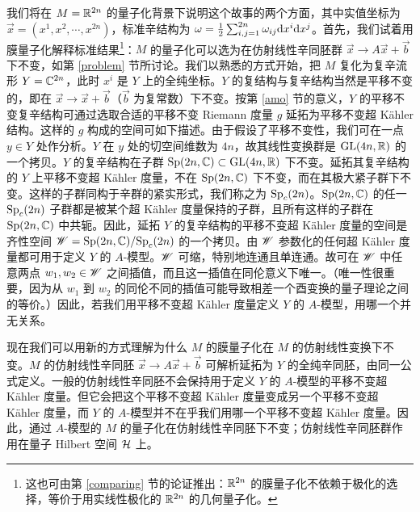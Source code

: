我们将在 $M={\mathbb R}^{2n}$ 的量子化背景下说明这个故事的两个方面，其中实值坐标为 $\vec x=(x^1,x^2,\cdots,x^{2n})$，标准辛结构为 $\omega=\frac12\sum_{i,j=1}^{2n}\omega_{ij}{\mathrm d} x^i{\mathrm d} x^j$。首先，我们试着用膜量子化解释标准结果\footnote{这也可由第 \ref{comparing} 节的论证推出：${\mathbb R}^{2n}$ 的膜量子化不依赖于极化的选择，等价于用实线性极化的 ${\mathbb R}^{2n}$ 的几何量子化。}：$M$ 的量子化可以选为在仿射线性辛同胚群 $\vec x\to A\vec x+\vec b$ 下不变，如第 \ref{problem} 节所讨论。我们以熟悉的方式开始，把 $M$ 复化为复辛流形 $Y={\mathbb C}^{2n}$，此时 $x^i$ 是 $Y$ 上的全纯坐标。$Y$ 的复结构与复辛结构当然是平移不变的，即在 $\vec x\to\vec x+\vec b$（$\vec b$ 为复常数）下不变。按第 \ref{amo} 节的意义，$Y$ 的平移不变复辛结构可通过选取合适的平移不变 Riemann 度量 $g$ 延拓为平移不变超 Kähler 结构。这样的 $g$ 构成的空间可如下描述。由于假设了平移不变性，我们可在一点 $y\in Y$ 处作分析。$Y$ 在 $y$ 处的切空间维数为 $4n$，故其线性变换群是 ${\mathrm{GL}}(4n,{\mathbb R})$ 的一个拷贝。$Y$ 的复辛结构在子群 ${\mathrm{Sp}}(2n,{\mathbb C})\subset{\mathrm{GL}}(4n,{\mathbb R})$ 下不变。延拓其复辛结构的 $Y$ 上平移不变超 Kähler 度量，不在 ${\mathrm{Sp}}(2n,{\mathbb C})$ 下不变，而在其极大紧子群下不变。这样的子群同构于辛群的紧实形式，我们称之为 ${\mathrm{Sp}}_c(2n)$。${\mathrm{Sp}}(2n,{\mathbb C})$ 的任一 ${\mathrm{Sp}}_c(2n)$ 子群都是被某个超 Kähler 度量保持的子群，且所有这样的子群在 ${\mathrm{Sp}}(2n,{\mathbb C})$ 中共轭。因此，延拓 $Y$ 的复辛结构的平移不变超 Kähler 度量的空间是齐性空间 ${\mathscr W}={\mathrm{Sp}}(2n,{\mathbb C})/{\mathrm{Sp}}_c(2n)$ 的一个拷贝。由 ${\mathscr W}$ 参数化的任何超 Kähler 度量都可用于定义 $Y$ 的 $A$-模型。${\mathscr W}$ 可缩，特别地连通且单连通。故可在 ${\mathscr W}$ 中任意两点 $w_1,w_2\in{\mathscr W}$ 之间插值，而且这一插值在同伦意义下唯一。（唯一性很重要，因为从 $w_1$ 到 $w_2$ 的同伦不同的插值可能导致相差一个酉变换的量子理论之间的等价。）因此，若我们用平移不变超 Kähler 度量定义 $Y$ 的 $A$-模型，用哪一个并无关系。

现在我们可以用新的方式理解为什么 $M$ 的膜量子化在 $M$ 的仿射线性变换下不变。$M$ 的仿射线性辛同胚 $\vec x\to A\vec x+\vec b$ 可解析延拓为 $Y$ 的全纯辛同胚，由同一公式定义。一般的仿射线性辛同胚不会保持用于定义 $Y$ 的 $A$-模型的平移不变超 Kähler 度量。但它会把这个平移不变超 Kähler 度量变成另一个平移不变超 Kähler 度量，而 $Y$ 的 $A$-模型并不在乎我们用哪一个平移不变超 Kähler 度量。因此，通过 $A$-模型的 $M$ 的量子化在仿射线性辛同胚下不变；仿射线性辛同胚群作用在量子 Hilbert 空间 ${\mathcal H}$ 上。

